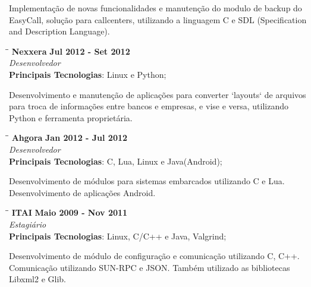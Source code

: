 \documentclass[margin]{res}
\begin{document}
\begin{resume}
    Implementação de novas funcionalidades e manutenção do modulo de backup do EasyCall, solução para callcenters, utilizando a linguagem C e SDL (Specification and Description Language).

   \begin{tabbing}
   \hspace{2.3in}\= \hspace{1.7in}\= \kill %
    \textbf{Nexxera}    \>\>\textbf{Jul 2012 - Set 2012}\\
    \textit{Desenvolvedor}\\
    \textbf{Principais Tecnologias}: Linux e Python;
   \end{tabbing}\vspace{-20pt}      %
    \vspace{2mm}
    Desenvolvimento e manutenção de aplicações para converter `layouts` de arquivos para troca de informações entre bancos e empresas, e vise e versa, utilizando Python e ferramenta proprietária.

   \begin{tabbing}
   \hspace{2.3in}\= \hspace{1.5in}\= \kill %
    \textbf{Ahgora}    \>\>\textbf{Jan 2012 - Jul 2012}\\
    \textit{Desenvolvedor}\\
    \textbf{Principais Tecnologias}: C, Lua, Linux e Java(Android);
   \end{tabbing}\vspace{-20pt}      %
    \vspace{2mm}
    
       Desenvolvimento de módulos para sistemas embarcados utilizando C e Lua. Desenvolvimento de aplicações Android.

   \begin{tabbing}
   \hspace{2.3in}\= \hspace{1.5in}\= \kill %
    \textbf{ITAI}    \>\>\textbf{Maio 2009 - Nov 2011}\\
    \textit{Estagiário}\\
    \textbf{Principais Tecnologias}: Linux, C/C++ e Java, Valgrind;
   \end{tabbing}\vspace{-20pt}      %
    \vspace{2mm}
       Desenvolvimento de módulo de configuração e comunicação utilizando C, C++. Comunicação utilizando SUN-RPC e JSON. Também utilizado as bibliotecas Libxml2 e Glib.



\end{resume}
\end{document}
